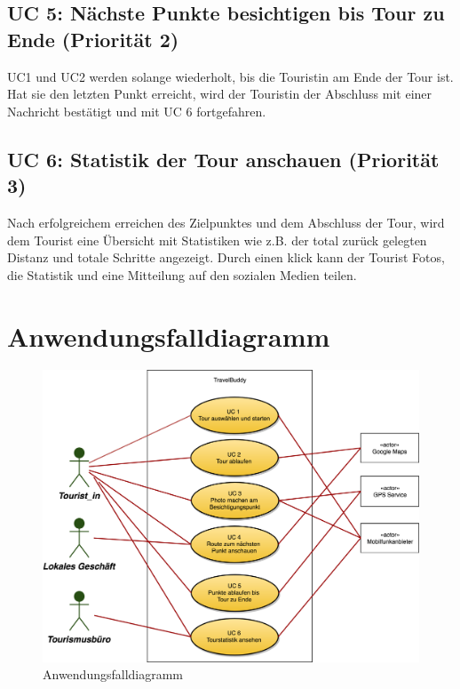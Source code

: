\documentclass[a4paper,10pt,xetex]{article}
\begin{document}
\subsection{UC 5: Nächste Punkte besichtigen bis Tour zu Ende (Priorität 2)}\label{uc-5-user-besucht-nuxe4chste-punkte-bis-tour-zu-ende.-priorituxe4t-2}
UC1 und UC2 werden solange wiederholt, bis die Touristin am Ende der Tour
ist. Hat sie den letzten Punkt erreicht, wird der Touristin der Abschluss
mit einer Nachricht bestätigt und mit UC 6 fortgefahren.


\subsection{UC 6: Statistik der Tour anschauen (Priorität 3)}\label{uc-6-user-sieht-statistik-der-tour.-priorituxe4t-3}
Nach erfolgreichem erreichen des Zielpunktes und dem Abschluss der Tour,
wird dem Tourist eine Übersicht mit Statistiken wie z.B. der total
zurück gelegten Distanz und totale Schritte angezeigt. Durch einen klick
kann der Tourist Fotos, die Statistik und eine Mitteilung auf den
sozialen Medien teilen.


\section{Anwendungsfalldiagramm}\label{anwendungsfalldiagramm}

\begin{figure}
  \centering
  \includegraphics{Anwendungsfalldiagramm}
  \caption{Anwendungsfalldiagramm}
\end{figure}
\end{document}
